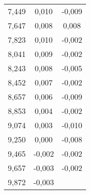 \begin{longtable}{c c c}
	7,449&0,010&-0,009 \\
	7,647&0,008&0,008 \\
	7,823&0,010&-0,002 \\
	8,041&0,009&-0,002 \\
	8,243&0,008&-0,005 \\
	8,452&0,007&-0,002 \\
	8,657&0,006&-0,009 \\
	8,853&0,004&-0,002 \\
	9,074&0,003&-0,010 \\
	9,250&0,000&-0,008 \\
	9,465&-0,002&-0,002 \\
	9,657&-0,003&-0,002 \\
	9,872&-0,003& \\
\end{longtable}
